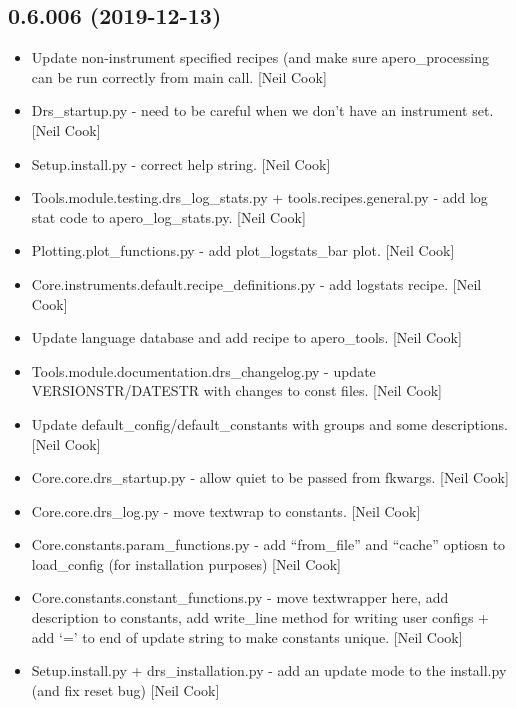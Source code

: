 \documentclass[a4paper,10pt,english]{report}
\begin{document}
\subsection{0.6.006 (2019-12-13)}
\label{\detokenize{misc/changelog:id11}}\begin{itemize}
\item {} 
Update non-instrument specified recipes (and make sure
apero\_processing can be run correctly from main call. {[}Neil Cook{]}

\item {} 
Drs\_startup.py - need to be careful when we don’t have an instrument
set. {[}Neil Cook{]}

\item {} 
Setup.install.py - correct help string. {[}Neil Cook{]}

\item {} 
Tools.module.testing.drs\_log\_stats.py + tools.recipes.general.py - add
log stat code to apero\_log\_stats.py. {[}Neil Cook{]}

\item {} 
Plotting.plot\_functions.py - add plot\_logstats\_bar plot. {[}Neil Cook{]}

\item {} 
Core.instruments.default.recipe\_definitions.py - add logstats recipe.
{[}Neil Cook{]}

\item {} 
Update language database and add recipe to apero\_tools. {[}Neil Cook{]}

\item {} 
Tools.module.documentation.drs\_changelog.py - update
VERSIONSTR/DATESTR with changes to const files. {[}Neil Cook{]}

\item {} 
Update default\_config/default\_constants with groups and some
descriptions. {[}Neil Cook{]}

\item {} 
Core.core.drs\_startup.py - allow quiet to be passed from fkwargs.
{[}Neil Cook{]}

\item {} 
Core.core.drs\_log.py - move textwrap to constants. {[}Neil Cook{]}

\item {} 
Core.constants.param\_functions.py - add “from\_file” and “cache”
optiosn to load\_config (for installation purposes) {[}Neil Cook{]}

\item {} 
Core.constants.constant\_functions.py - move textwrapper here, add
description to constants, add write\_line method for writing user
configs + add ‘=’ to end of update string to make constants unique.
{[}Neil Cook{]}

\item {} 
Setup.install.py + drs\_installation.py - add an update mode to the
install.py (and fix reset bug) {[}Neil Cook{]}

\end{itemize}
\end{document}
